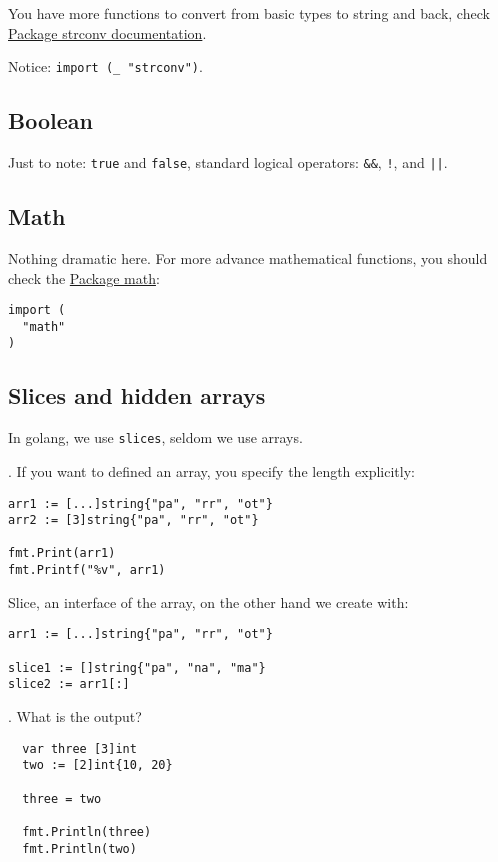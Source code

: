 \documentclass[11pt, letterpaper]{article}
\begin{document}
You have more functions to convert from basic types to string and back, check \href{https://golang.org/pkg/strconv}{Package strconv documentation}.

Notice: \texttt{import (_ "strconv")}.

\subsection{Boolean}

Just to note: \texttt{true} and \texttt{false}, standard logical operators: \texttt{&&}, \texttt{!}, and \texttt{||}.

\subsection{Math}
Nothing dramatic here. For more advance mathematical functions, you should check the \href{https://golang.org/pkg/math}{Package math}:
\begin{verbatim}
import (
  "math"
)
\end{verbatim}

\subsection{Slices and hidden arrays}
In golang, we use \verb|slices|, seldom we use arrays.

. If you want to defined an array, you specify the length explicitly:

\begin{verbatim}
arr1 := [...]string{"pa", "rr", "ot"}
arr2 := [3]string{"pa", "rr", "ot"}

fmt.Print(arr1)
fmt.Printf("%v", arr1)
\end{verbatim}

Slice, an interface of the array, on the other hand we create with:

\begin{verbatim}
arr1 := [...]string{"pa", "rr", "ot"}

slice1 := []string{"pa", "na", "ma"}
slice2 := arr1[:]
\end{verbatim}

. What is the output?

\begin{verbatim}
  var three [3]int
  two := [2]int{10, 20}

  three = two

  fmt.Println(three)
  fmt.Println(two)
\end{verbatim}
\end{document}

